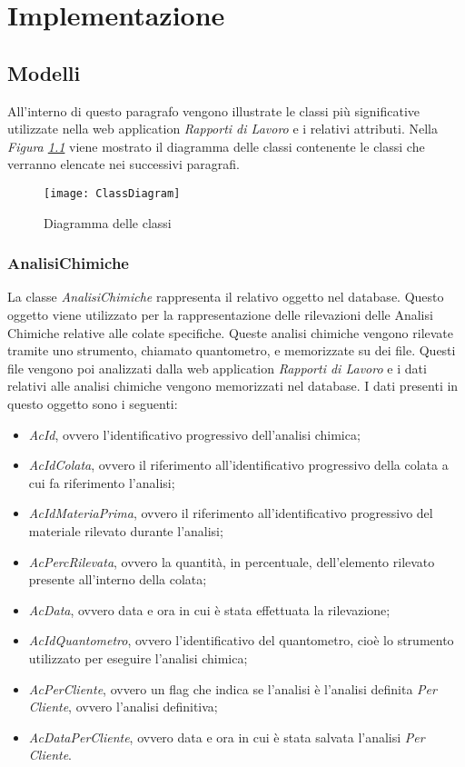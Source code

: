 \chapter{Implementazione}
  \label{chapter_implementazione}
  \section{Modelli}
  All'interno di questo paragrafo vengono illustrate le classi più significative utilizzate nella web application
  \textit{Rapporti di Lavoro} e i relativi attributi. Nella \textit{Figura \ref{fig:ClassDiagram}} viene mostrato il
  diagramma delle classi contenente le classi che verranno elencate nei successivi paragrafi.

  \begin{figure}[H]
    \texttt{[image: ClassDiagram]}
    \centering
    \caption{Diagramma delle classi}
    \label{fig:ClassDiagram}
  \end{figure}

  \subsection{AnalisiChimiche}
  La classe \textit{AnalisiChimiche} rappresenta il relativo oggetto nel database. Questo oggetto viene utilizzato per la
  rappresentazione delle rilevazioni delle Analisi Chimiche relative alle colate specifiche. Queste analisi chimiche vengono
  rilevate tramite uno strumento, chiamato quantometro, e memorizzate su dei file. Questi file vengono poi analizzati dalla
  web application \textit{Rapporti di Lavoro} e i dati relativi alle analisi chimiche vengono memorizzati nel database. I dati
  presenti in questo oggetto sono i seguenti:
  \begin{itemize}
    \item \textit{AcId}, ovvero l'identificativo progressivo dell'analisi chimica;
    \item \textit{AcIdColata}, ovvero il riferimento all'identificativo progressivo della colata a cui fa riferimento
    l'analisi;
    \item \textit{AcIdMateriaPrima}, ovvero il riferimento all'identificativo progressivo del materiale rilevato durante
    l'analisi;
    \item \textit{AcPercRilevata}, ovvero la quantità, in percentuale, dell'elemento rilevato presente all'interno della
    colata;
    \item \textit{AcData}, ovvero data e ora in cui è stata effettuata la rilevazione;
    \item \textit{AcIdQuantometro}, ovvero l'identificativo del quantometro, cioè lo strumento utilizzato per eseguire
    l'analisi chimica;
    \item \textit{AcPerCliente}, ovvero un flag che indica se l'analisi è l'analisi definita \textit{Per Cliente},
    ovvero l'analisi definitiva;
    \item \textit{AcDataPerCliente}, ovvero data e ora in cui è stata salvata l'analisi \textit{Per Cliente}.
  \end{itemize}

